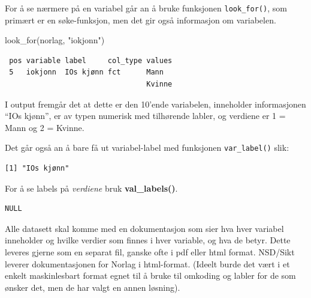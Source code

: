\documentclass[
  letterpaper,
  DIV=11,
  numbers=noendperiod]{scrreprt}
\newenvironment{Shaded}{\begin{snugshade}}{\end{snugshade}}
\newcommand{\FunctionTok}[1]{\textcolor[rgb]{0.28,0.35,0.67}{#1}}
\newcommand{\NormalTok}[1]{\textcolor[rgb]{0.00,0.23,0.31}{#1}}
\newcommand{\SpecialCharTok}[1]{\textcolor[rgb]{0.37,0.37,0.37}{#1}}
\newcommand{\StringTok}[1]{\textcolor[rgb]{0.13,0.47,0.30}{#1}}
\theoremstyle{definition}
\theoremstyle{remark}
\begin{document}
For å se nærmere på en variabel går an å bruke funksjonen
\texttt{look\_for()}, som primært er en søke-funksjon, men det gir også
informasjon om variabelen.

\begin{Shaded}
\begin{Highlighting}[]
\FunctionTok{look\_for}\NormalTok{(norlag, }\StringTok{"iokjonn"}\NormalTok{)}
\end{Highlighting}
\end{Shaded}

\begin{verbatim}
 pos variable label     col_type values
 5   iokjonn  IOs kjønn fct      Mann  
                                 Kvinne
\end{verbatim}

I output fremgår det at dette er den 10'ende variabelen, inneholder
informasjonen ``IOs kjønn'', er av typen numerisk med tilhørende labler,
og verdiene er 1 = Mann og 2 = Kvinne.

Det går også an å bare få ut variabel-label med funksjonen
\texttt{var\_label()} slik:

\begin{Shaded}
\end{Shaded}

\begin{verbatim}
[1] "IOs kjønn"
\end{verbatim}

For å se labels på \emph{verdiene} bruk \textbf{val\_labels()}.

\begin{Shaded}
\end{Shaded}

\begin{verbatim}
NULL
\end{verbatim}

Alle datasett skal komme med en dokumentasjon som sier hva hver variabel
inneholder og hvilke verdier som finnes i hver variable, og hva de
betyr. Dette leveres gjerne som en separat fil, ganske ofte i pdf eller
html format. NSD/Sikt leverer dokumentasjonen for Norlag i html-format.
(Ideelt burde det vært i et enkelt maskinlesbart format egnet til å
bruke til omkoding og labler for de som ønsker det, men de har valgt en
annen løsning).
\end{document}

